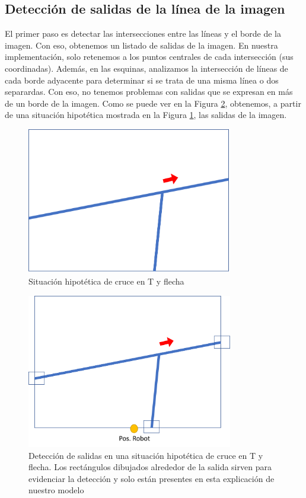\documentclass{article}
\begin{document}
    \subsection{Detección de salidas de la línea de la imagen}
        El primer paso es detectar las intersecciones entre las líneas y el borde de la imagen. Con eso, obtenemos un listado de salidas de la imagen. En nuestra implementación, solo retenemos a los puntos centrales de cada intersección (sus coordinadas). Además, en las esquinas, analizamos la intersección de líneas de cada borde adyacente para determinar si se trata de una misma línea o dos separardas. Con eso, no tenemos problemas con salidas que se expresan en más de un borde de la imagen. Como se puede ver en la Figura \ref{fig:consigna2}, obtenemos, a partir de una situación hipotética mostrada en la Figura \ref{fig:consigna1}, las salidas de la imagen.

        \begin{figure}[]
            \centering
            \includegraphics[width=9cm]{figures/consigna1.png}
            \caption{Situación hipotética de cruce en T y flecha}
            \label{fig:consigna1}
        \end{figure}

        \begin{figure}[]
            \centering
            \includegraphics[width=9cm]{figures/consigna2.png}
            \caption{Detección de salidas en una situación hipotética de cruce en T y flecha. Los rectángulos dibujados alrededor de la salida sirven para evidenciar la detección y solo están presentes en esta explicación de nuestro modelo}
            \label{fig:consigna2}
        \end{figure}
\end{document}

